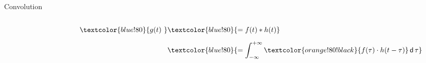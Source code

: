 \begin{frame}[t]{Convolution}
\begin{center}
\begin{columns}[t, onlytextwidth]
\begin{column}{0.5\textwidth}
            \end{column}%

            \begin{column}{0.5\textwidth}
                \centering{}
                \only<1>{\scalebox{0.5}{}}%
                \begin{align*}
                    \textcolor{blue!80}{g(t)~} & \textcolor{blue!80}{= f(t) \ast h(t)}                                                                                   \\[0.2cm]
                                               & \textcolor{blue!80}{= \int_{-\infty}^{+\infty} \textcolor{orange!80!black}{f(\tau) \cdot h(t-\tau)}\, \mathsf{d}\,\tau}
                \end{align*}

            \end{column}
        \end{columns}
    \end{center}
\end{frame}





